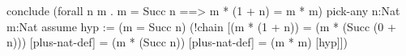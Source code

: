 %
%
\begin{tcAthena}
conclude (forall n m . m = Succ n ==> m * (1 + n) = m * m)
  pick-any n:Nat m:Nat
    assume hyp := (m = Succ n)
      (!chain [(m * (1 + n))
             = (m * (Succ (0 + n))) [plus-nat-def]
             = (m * (Succ n))       [plus-nat-def]
             = (m * m)              [hyp]])
\end{tcAthena}
